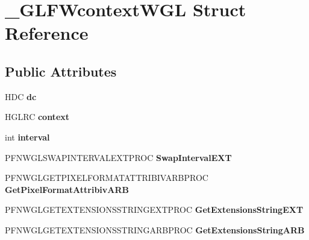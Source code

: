 \hypertarget{struct__GLFWcontextWGL}{}\section{\+\_\+\+G\+L\+F\+Wcontext\+W\+G\+L Struct Reference}
\label{struct__GLFWcontextWGL}
\subsection*{Public Attributes}
\begin{DoxyCompactItemize}
\item 
\hypertarget{struct__GLFWcontextWGL_ad4527b026db03447500ac5000d552c2a}{}H\+D\+C {\bfseries dc}\label{struct__GLFWcontextWGL_ad4527b026db03447500ac5000d552c2a}

\item 
\hypertarget{struct__GLFWcontextWGL_a5c15cbae03a7ad0d0e341c2eb1286f14}{}H\+G\+L\+R\+C {\bfseries context}\label{struct__GLFWcontextWGL_a5c15cbae03a7ad0d0e341c2eb1286f14}

\item 
\hypertarget{struct__GLFWcontextWGL_a54b4c34b50cf386de81edd9e086273ee}{}int {\bfseries interval}\label{struct__GLFWcontextWGL_a54b4c34b50cf386de81edd9e086273ee}

\item 
\hypertarget{struct__GLFWcontextWGL_a2c4eafe98b0ab96282c60d62acdb9232}{}P\+F\+N\+W\+G\+L\+S\+W\+A\+P\+I\+N\+T\+E\+R\+V\+A\+L\+E\+X\+T\+P\+R\+O\+C {\bfseries Swap\+Interval\+E\+X\+T}\label{struct__GLFWcontextWGL_a2c4eafe98b0ab96282c60d62acdb9232}

\item 
\hypertarget{struct__GLFWcontextWGL_a42b3cf814a2663b09549e5296794550d}{}P\+F\+N\+W\+G\+L\+G\+E\+T\+P\+I\+X\+E\+L\+F\+O\+R\+M\+A\+T\+A\+T\+T\+R\+I\+B\+I\+V\+A\+R\+B\+P\+R\+O\+C {\bfseries Get\+Pixel\+Format\+Attribiv\+A\+R\+B}\label{struct__GLFWcontextWGL_a42b3cf814a2663b09549e5296794550d}

\item 
\hypertarget{struct__GLFWcontextWGL_a28061aa80bae880193bcf44c4ba1afc4}{}P\+F\+N\+W\+G\+L\+G\+E\+T\+E\+X\+T\+E\+N\+S\+I\+O\+N\+S\+S\+T\+R\+I\+N\+G\+E\+X\+T\+P\+R\+O\+C {\bfseries Get\+Extensions\+String\+E\+X\+T}\label{struct__GLFWcontextWGL_a28061aa80bae880193bcf44c4ba1afc4}

\item 
\hypertarget{struct__GLFWcontextWGL_a9739a27eddefdfb3fb79be1512205d7d}{}P\+F\+N\+W\+G\+L\+G\+E\+T\+E\+X\+T\+E\+N\+S\+I\+O\+N\+S\+S\+T\+R\+I\+N\+G\+A\+R\+B\+P\+R\+O\+C {\bfseries Get\+Extensions\+String\+A\+R\+B}\label{struct__GLFWcontextWGL_a9739a27eddefdfb3fb79be1512205d7d}


\end{DoxyCompactItemize}
